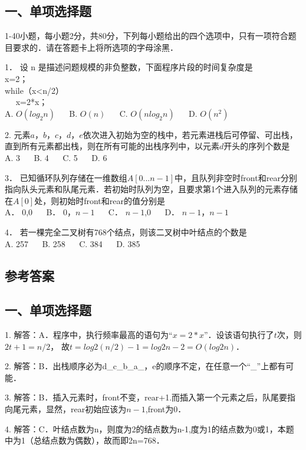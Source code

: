 
\subsection{一、单项选择题}
1-40小题，每小题2分，共80分，下列每小题给出的四个选项中，只有一项符合题目要求的．请在答题卡上将所选项的字母涂黑．

1． 设 n 是描述问题规模的非负整数，下面程序片段的时间复杂度是  \\
x=2；  \\
while（x<n/2）  \\
$\quad$ x=2*x；  \\
A. $O(log_2n)$ $\quad$ B. $O(n)$ $\quad$ C. $O(nlog_2n)$ $\quad$ D. $O(n^2)$

2. 元素$a$，$b$，$c$，$d$，$e$依次进入初始为空的栈中，若元素进栈后可停留、可出栈，直到所有元素都出栈，则在所有可能的出栈序列中，以元素$d$开头的序列个数是  \\
A. 3  $\quad$  B. 4  $\quad$  C. 5  $\quad$  D. 6

3． 已知循环队列存储在一维数组$A[0...n-1]$中，且队列非空时front和rear分别指向队头元素和队尾元素．若初始时队列为空，且要求第1个进入队列的元素存储在$A[0]$处，则初始时front和rear的值分别是 \\
A． $0$,$0$  $\quad$ B． $0$，$n-1$ $\quad$ C． $n-1$,$0$ $\quad$ D． $n-1$，$n-1$ 

4． 若一棵完全二叉树有768个结点，则该二叉树中叶结点的个数是 \\
A. 257 $\quad$ B. 258 $\quad$ C. 384 $\quad$ D. 385


\subsection{参考答案}
\subsection{一、单项选择题}
1. 解答：A．程序中，执行频率最高的语句为“$x=2*x$”．设该语句执行了$t$次，则$2t+1=n/2$， 故$t=log2(n/2)-1=log2n-2= O(log2n)$．

2. 解答：B．出栈顺序必为d_c_b_a_，e的顺序不定，在任意一个“_”上都有可能．

3. 解答：B．插入元素时，front不变，rear+1.而插入第一个元素之后，队尾要指向尾元素，显然，rear初始应该为$n-1$,front为$0$．

4. 解答：C．叶结点数为n，则度为2的结点数为n-1,度为1的结点数为0或1，本题中为1（总结点数为偶数），故而即2n=768．